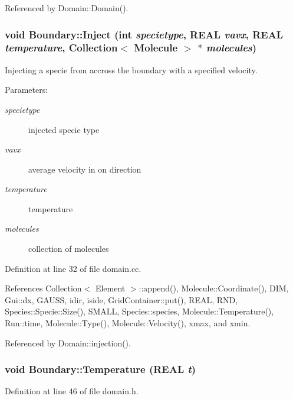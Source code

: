 Referenced by Domain::Domain().\hypertarget{structBoundary_226f02b6130f1f539702f6c599c0eb15}{
\subsubsection[{Inject}]{\setlength{\rightskip}{0pt plus 5cm}void Boundary::Inject (int {\em specietype}, \/  REAL {\em vavx}, \/  REAL {\em temperature}, \/  {\bf Collection}$<$ {\bf Molecule} $>$ $\ast$ {\em molecules})}}
\label{structBoundary_226f02b6130f1f539702f6c599c0eb15}


Injecting a specie from accross the boundary with a specified velocity. 

\begin{Desc}
\item[Parameters:]
\begin{description}
\item[{\em specietype}]injected specie type \item[{\em vavx}]average velocity in on direction \item[{\em temperature}]temperature \item[{\em molecules}]collection of molecules \end{description}
\end{Desc}


Definition at line 32 of file domain.cc.

References Collection$<$ Element $>$::append(), Molecule::Coordinate(), DIM, Gui::dx, GAUSS, idir, iside, GridContainer::put(), REAL, RND, Species::Specie::Size(), SMALL, Species::species, Molecule::Temperature(), Run::time, Molecule::Type(), Molecule::Velocity(), xmax, and xmin.

Referenced by Domain::injection().\hypertarget{structBoundary_127d3c02420e5d8ec675e91b4fad9030}{
\subsubsection[{Temperature}]{\setlength{\rightskip}{0pt plus 5cm}void Boundary::Temperature (REAL {\em t})}}
\label{structBoundary_127d3c02420e5d8ec675e91b4fad9030}




Definition at line 46 of file domain.h.

